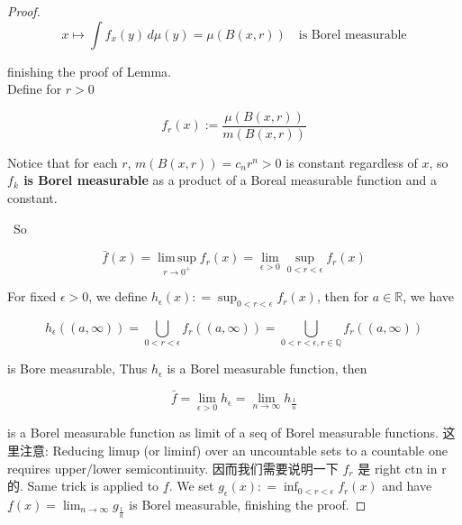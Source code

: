 \documentclass{qlnotes-export}
\begin{document}
\begin{proof}
\[x\mapsto\int f_{x}(y)\, d\mu(y) = \mu(B(x,r))\quad\text{is Borel measurable}\]

finishing the proof of Lemma.\\
Define for \(r > 0\)

\[f_{r}(x) := \frac{\mu(B\left( {x,r} \right))}{m(B\left( {x,r} \right))}\]

Notice that for each \(r\), \(m(B(x,r)) = c_{n}r^{n} > 0\) is constant regardless of \(x\), so \textbf{\(f_{k}\) is Borel measurable} as a product of a Boreal measurable function and a constant.\\
\strut ~So

\[\bar{f}(x) = \operatorname{lim\, sup}\limits_{r\rightarrow 0^{+}}f_{r}(x) = \lim\limits_{\epsilon > 0}\sup\limits_{0 < r < \epsilon}f_{r}(x)\]

For fixed \(\epsilon > 0\), we define \(h_{\epsilon}(x): = \sup_{0 < r < \epsilon}f_{r}(x)\), then for \(a \in {\mathbb{R}}\), we have

\[h_{\epsilon}((a,\infty)) = \bigcup\limits_{0 < r < \epsilon}f_{r}((a,\infty)) = \bigcup\limits_{0 < r < \epsilon,r \in {\mathbb{Q}}}f_{r}((a,\infty))\]

is Bore measurable, Thus \(h_{\epsilon}\) is a Borel measurable function, then

\[\bar{f} = \lim\limits_{\epsilon > 0}h_{\epsilon} = \lim\limits_{n\rightarrow\infty}h_{\frac{1}{n}}\]

is a Borel measurable function as limit of a seq of Borel measurable functions. 这里注意: Reducing limup (or liminf) over an uncountable sets to a countable one requires upper/lower semicontinuity. 因而我们需要说明一下 \(f_{r}\) 是 right ctn in r 的. Same trick is applied to \(\underset{¯}{f}\). We set \(g_{\epsilon}(x): = \inf_{0 < r < \epsilon}f_{r}(x)\) and have \(\underset{¯}{f}(x) = \lim_{n\rightarrow\infty}g_{\frac{1}{n}}\) is Borel measurable, finishing the proof.

\end{proof}
\end{document}
